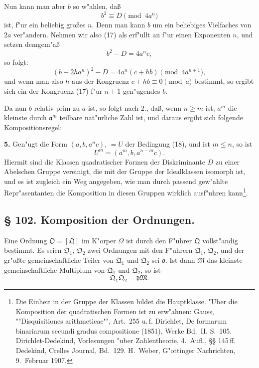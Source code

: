\documentclass[12pt,a4paper]{article}
\theoremstyle{plain}
\begin{document}
Nun kann man aber $b$ so w"ahlen, da\ss{}
\begin{equation}
b^2 \equiv D \pmod{4a^n}
\tag{17}
\end{equation}
ist, f"ur ein beliebig gro\ss es $n$. Denn man kann $b$ um ein beliebiges Vielfaches von $2a$ ver"andern. Nehmen wir also (17) als erf"ullt an f"ur einen Exponenten $n$, und setzen demgem"a\ss{}
\begin{equation}
b^2 - D = 4a^n c,
\tag{18}
\end{equation}
so folgt:
\[
(b + 2ha^n)^2 - D = 4a^n(c + hb) \pmod{4a^{n+1}},
\]
und wenn man also $h$ aus der Kongruenz $c + hb \equiv 0 \pmod{a}$ bestimmt, so ergibt sich ein der Kongruenz (17) f"ur $n+1$ gen"ugendes $b$.

Da nun $b$ relativ prim zu $a$ ist, so folgt nach 2., da\ss{}, wenn $n \geq m$ ist, $a^m$ die kleinste durch $\mathfrak{a}^m$ teilbare nat"urliche Zahl ist, und daraus ergibt sich folgende Kompositionsregel:

\textbf{5.} Gen"ugt die Form $(a, b, a^n c)$, $= U$ der Bedingung (18), und ist $m \leq n$, so ist
\[
U^m = (a^m, b, a^{n-m}c).
\]
Hiermit sind die Klassen quadratischer Formen der Diskriminante $D$ zu einer Abelschen Gruppe vereinigt, die mit der Gruppe der Idealklassen isomorph ist, und es ist zugleich ein Weg angegeben, wie man durch passend gew"ahlte Repr"asentanten die Komposition in diesen Gruppen wirklich ausf"uhren kann\footnote{Die Einheit in der Gruppe der Klassen bildet die Hauptklasse. "Uber die Komposition der quadratischen Formen ist zu erw"ahnen: Gauss, ""Disquisitiones arithmeticae"", Art.~255 u.\,f. Dirichlet, De formarum binariarum secundi gradus compositione (1851), Werke Bd.~II, S.~105. Dirichlet-Dedekind, Vorlesungen "uber Zahlentheorie, 4.~Aufl., \S\S{} 145\,ff. Dedekind, Crelles Journal, Bd.~129. H.~Weber, G"ottinger Nachrichten, 9.~Februar 1907.}.

\subsection*{\S{} 102. Komposition der Ordnungen.}

Eine Ordnung $\mathfrak{O} = [\mathfrak{Q}]$ im K"orper $\Omega$ ist durch den F"uhrer $\mathfrak{Q}$ vollst"andig bestimmt. Es seien $\mathfrak{O}_1$, $\mathfrak{O}_2$ zwei Ordnungen mit den F"uhrern $\mathfrak{Q}_1$, $\mathfrak{Q}_2$, und der gr"o\ss te gemeinschaftliche Teiler von $\mathfrak{Q}_1$ und $\mathfrak{Q}_2$ sei $\mathfrak{d}$. Ist dann $\mathfrak{M}$ das kleinste gemeinschaftliche Multiplum von $\mathfrak{Q}_1$ und $\mathfrak{Q}_2$, so ist
\begin{equation}
\mathfrak{Q}_1 \mathfrak{Q}_2 = \mathfrak{d}\mathfrak{M}.
\tag{1}
\end{equation}
\end{document}
